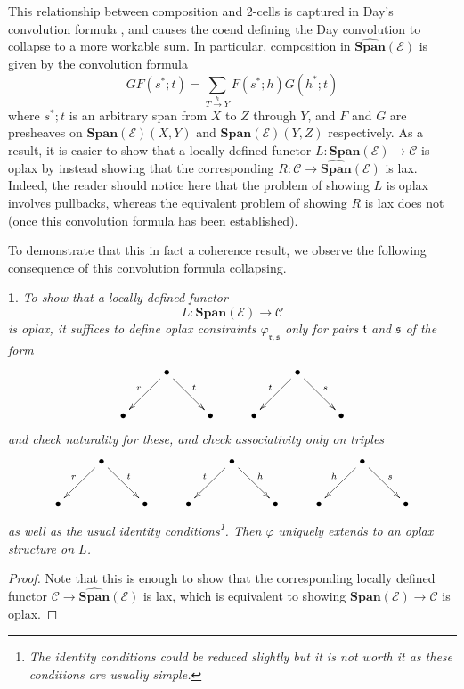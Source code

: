 \documentclass[a4paper,oneside,english]{amsart}
\numberwithin{equation}{section}
\numberwithin{figure}{section}
\theoremstyle{plain}
\theoremstyle{definition}
\theoremstyle{remark}
\theoremstyle{definition}
\theoremstyle{plain}
\theoremstyle{plain}
\newtheorem{cor}[thm]{\protect\corollaryname}
\theoremstyle{plain}
\providecommand{\corollaryname}{Corollary}
\begin{document}
This relationship between composition and 2-cells is captured in Day's
convolution formula \cite{dayconvolution}, and causes the coend defining
the Day convolution to collapse to a more workable sum. In particular,
composition in $\hat{\mathbf{Span}}\left(\mathcal{E}\right)$ is given
by the convolution formula
\[
{\displaystyle GF\left(s^{*};t\right)=\sum_{T\stackrel{h}{\longrightarrow}Y}F\left(s^{*};h\right)G\left(h^{*};t\right)}
\]
where $s^{*};t$ is an arbitrary span from $X$ to $Z$ through $Y$,
and $F$ and $G$ are presheaves on $\mathbf{Span}\left(\mathcal{E}\right)\left(X,Y\right)$
and $\mathbf{Span}\left(\mathcal{E}\right)\left(Y,Z\right)$ respectively.
As a result, it is easier to show that a locally defined functor $L\colon\mathbf{Span}\left(\mathcal{E}\right)\to\mathscr{C}$
is oplax by instead showing that the corresponding $R:\mathscr{C}\to\hat{\mathbf{Span}}\left(\mathcal{E}\right)$
is lax. Indeed, the reader should notice here that the problem of
showing $L$ is oplax involves pullbacks, whereas the equivalent problem
of showing $R$ is lax does not (once this convolution formula has
been established).

To demonstrate that this in fact a coherence result, we observe the
following consequence of this convolution formula collapsing.
\begin{cor}
To show that a locally defined functor 
\[
L:\mathbf{Span}\left(\mathcal{E}\right)\to\mathscr{C}
\]
 is oplax, it suffices to define oplax constraints $\varphi_{\mathfrak{r},\mathfrak{s}}$
only for pairs $\mathfrak{t}$ and $\mathfrak{s}$ of the form
\[
\xymatrix{ & \bullet\ar[dl]_{r}\ar[dr]^{t} &  &  & \bullet\ar[dl]_{t}\ar[dr]^{s}\\
\bullet &  & \bullet & \bullet &  & \bullet
}
\]
and check naturality for these, and check associativity only on triples
\[
\xymatrix{ & \bullet\ar[dl]_{r}\ar[dr]^{t} &  &  & \bullet\ar[dl]_{t}\ar[dr]^{h} &  &  & \bullet\ar[dl]_{h}\ar[dr]^{s}\\
\bullet &  & \bullet & \bullet &  & \bullet & \bullet &  & \bullet
}
\]
as well as the usual identity conditions\footnote{The identity conditions could be reduced slightly but it is not worth it as these conditions are usually simple.}.
Then $\varphi$ uniquely extends to an oplax structure on $L$.\end{cor}
\begin{proof}
Note that this is enough to show that the corresponding locally defined
functor $\mathscr{C}\to\hat{\mathbf{Span}}\left(\mathcal{E}\right)$
is lax, which is equivalent to showing $\mathbf{Span}\left(\mathcal{E}\right)\to\mathscr{C}$
is oplax.
\end{proof}
\end{document}
